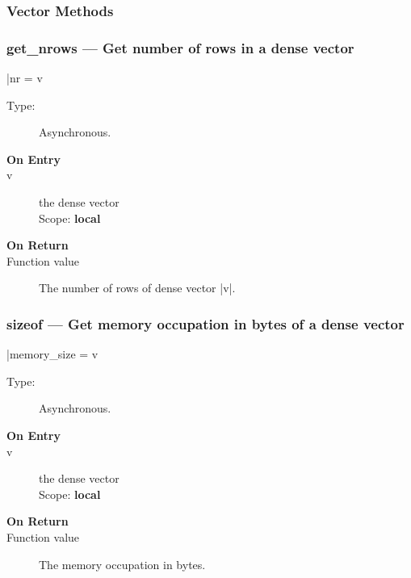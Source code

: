\subsubsection{Vector Methods}
\subsubsection{get\_nrows --- Get number of  rows in a dense vector}

\fortinline|nr = v%

\begin{description}
\item[Type:] Asynchronous.
\item[\bf On Entry]
\item[v] the dense vector\\
Scope: {\bf local}\\
\end{description}

\begin{description}
\item[\bf On Return]
\item[Function value] The number of  rows  of dense vector \fortinline|v|.
\end{description}


\subsubsection{sizeof  --- Get memory occupation in bytes
of  a dense vector}

\fortinline|memory_size = v%

\begin{description}
\item[Type:] Asynchronous.
\item[\bf On Entry]
\item[v] the dense vector\\
Scope: {\bf local}\\
\end{description}

\begin{description}
\item[\bf On Return]
\item[Function value] The memory occupation in bytes.
\end{description}


